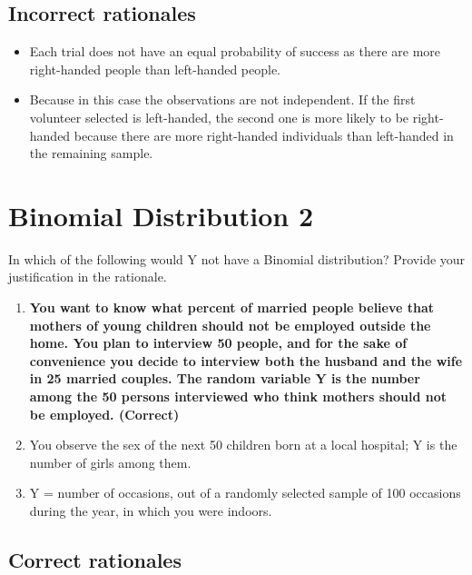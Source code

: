 \documentclass[letterpaper,9pt,twoside,printwatermark=false]{pinp}
\providecommand{\tightlist}{%
  \setlength{\itemsep}{0pt}\setlength{\parskip}{0pt}}
\begin{document}
\hypertarget{incorrect-rationales-7}{%
\subsection{Incorrect rationales}\label{incorrect-rationales-7}}

\begin{itemize}
\tightlist
\item
  Each trial does not have an equal probability of success as there are
  more right-handed people than left-handed people.
\item
  Because in this case the observations are not independent. If the
  first volunteer selected is left-handed, the second one is more likely
  to be right-handed because there are more right-handed individuals
  than left-handed in the remaining sample.
\end{itemize}

\hypertarget{binomial-distribution-2}{%
\section{Binomial Distribution 2}\label{binomial-distribution-2}}

In which of the following would Y not have a Binomial distribution?
Provide your justification in the rationale.

\begin{enumerate}
\def\labelenumi{\alph{enumi}.}
\tightlist
\item
  \textbf{You want to know what percent of married people believe that
  mothers of young children should not be employed outside the home. You
  plan to interview 50 people, and for the sake of convenience you
  decide to interview both the husband and the wife in 25 married
  couples. The random variable Y is the number among the 50 persons
  interviewed who think mothers should not be employed. (Correct)}
\item
  You observe the sex of the next 50 children born at a local hospital;
  Y is the number of girls among them.
\item
  Y = number of occasions, out of a randomly selected sample of 100
  occasions during the year, in which you were indoors.
\end{enumerate}

\hypertarget{correct-rationales-8}{%
\subsection{Correct rationales}\label{correct-rationales-8}}
\end{document}
